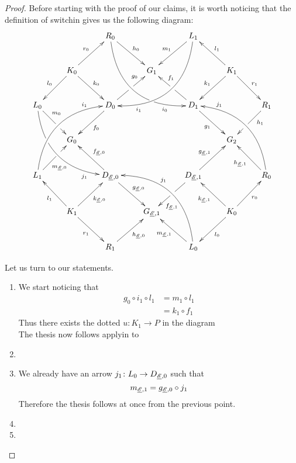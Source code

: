 \begin{proof}
	Before starting with the proof of our claims, it is worth noticing that the definition of switchin gives us the following diagram:
			\[\xymatrix@R=28pt{&&R_0 \ar@/_1.15cm/[ddrr]_(.8){i_0}|(.68)\hole \ar[dr]^{h_0}&& L_1\ar@/^1.15cm/[ddll]^(.8){i_1}  \ar[dl]_{m_1}\\&K_0\ar[dr]^{k_0}\ar[dl]_{l_0} \ar[ur]^{r_0}&& G_1 && K_1 \ar[dl]_{k_1}\ar[lu]_{l_1} \ar[dr]^{r_1}\\L_0 \ar@/_.94cm/[ddrr]_(.8){j_1}|(.31)\hole \ar[dr]^(.35){m_0}|(.6)\hole && D_0 \ar[dl]^{f_0}\ar[ur]|(.5)\hole^(.7){g_0}&&D_1 \ar[dr]_{g_1} \ar[ul]|(.5)\hole_(.65){f_1}&&R_1\ar[dl]^(.35){h_1}|(.6)\hole\\&G_0 &&&&G_2\\L_1 \ar@/^.94cm/[uurr]^(.8){i_1} \ar[ur]_(.35){m_{\der{E},0}}|(.61)\hole&&D_{\der{E},0} \ar[ul]_{f_{\der{E},0}}\ar[dr]^{g_{\der{E},0}} &&D_{\der{E},1}\ar[ur]^{g_{\der{E},1}} \ar[dl]|(.5)\hole^(.7){f_{\der{E},1}} && R_0  \ar@/_.94cm/[uull]_(.8){j_1} \ar[ul]^{h_{\der{E},1}}\\&K_1 \ar[ur]_{k_{\der{E},0}} \ar[dr]_{r_1} \ar[ul]^{l_1}&&G_{\der{E},1}&& K_0 \ar[ur]_{r_0} \ar[ul]^{k_{\der{E},1}} \ar[dl]^{l_0} \\&& R_1 \ar[ur]_{h_{\der{E},0}}&& L_0 \ar[ul]^{m_{\der{E},1}} \ar@/_1.15cm/[uull]_(.6){j_1} }\]
			
			Let us turn to our statements.
	\begin{enumerate}
		\item We start noticing that 
		\begin{align*}
			g_0\circ i_1\circ l_1&=m_1\circ l_1\\&=k_1\circ f_1
		\end{align*}
		Thus there exists the dotted $u\colon K_1\to P$ in the diagram
		\[\]
		The thesis now follows applyin  to
		
		

		\item 
		\item  We already have an arrow $j_1\colon L_0\to D_{\underline{\mathscr{E}},0}$ such that
		\[m_{\underline{\mathscr{E}},1}=g_{\underline{\mathscr{E}},0}\circ j_1\]
		Therefore the thesis follows at once from the previous point.

	
	
	\item 
		
		\item \qedhere 
	\end{enumerate}
\end{proof}

